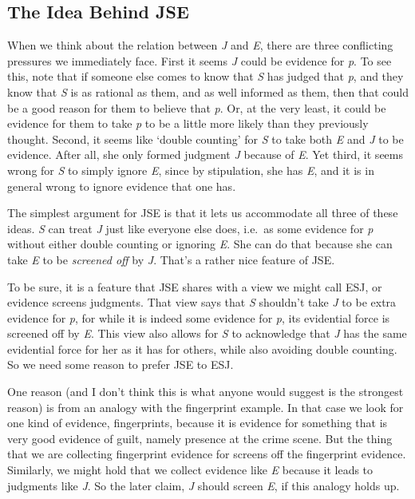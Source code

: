 \documentclass[
  10pt,
  letterpaper,
  DIV=11,
  numbers=noendperiod,
  twoside]{scrartcl}
\begin{document}
\subsection{The Idea Behind JSE}\label{the-idea-behind-jse}

When we think about the relation between \emph{J} and \emph{E}, there
are three conflicting pressures we immediately face. First it seems
\emph{J} could be evidence for \emph{p}. To see this, note that if
someone else comes to know that \emph{S} has judged that \emph{p}, and
they know that \emph{S} is as rational as them, and as well informed as
them, then that could be a good reason for them to believe that
\emph{p}. Or, at the very least, it could be evidence for them to take
\emph{p} to be a little more likely than they previously thought.
Second, it seems like `double counting' for \emph{S} to take both
\emph{E} and \emph{J} to be evidence. After all, she only formed
judgment \emph{J} because of \emph{E}. Yet third, it seems wrong for
\emph{S} to simply ignore \emph{E}, since by stipulation, she has
\emph{E}, and it is in general wrong to ignore evidence that one has.

The simplest argument for JSE is that it lets us accommodate all three
of these ideas. \emph{S} can treat \emph{J} just like everyone else
does, i.e.~as some evidence for \emph{p} without either double counting
or ignoring \emph{E}. She can do that because she can take \emph{E} to
be \emph{screened off} by \emph{J}. That's a rather nice feature of JSE.

To be sure, it is a feature that JSE shares with a view we might call
ESJ, or evidence screens judgments. That view says that \emph{S}
shouldn't take \emph{J} to be extra evidence for \emph{p}, for while it
is indeed some evidence for \emph{p}, its evidential force is screened
off by \emph{E}. This view also allows for \emph{S} to acknowledge that
\emph{J} has the same evidential force for her as it has for others,
while also avoiding double counting. So we need some reason to prefer
JSE to ESJ.

One reason (and I don't think this is what anyone would suggest is the
strongest reason) is from an analogy with the fingerprint example. In
that case we look for one kind of evidence, fingerprints, because it is
evidence for something that is very good evidence of guilt, namely
presence at the crime scene. But the thing that we are collecting
fingerprint evidence for screens off the fingerprint evidence.
Similarly, we might hold that we collect evidence like \emph{E} because
it leads to judgments like \emph{J}. So the later claim, \emph{J} should
screen \emph{E}, if this analogy holds up.
\end{document}
